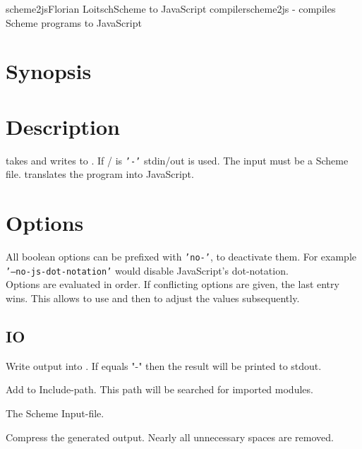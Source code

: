 
\begin{Name}{1}{scheme2js}{Florian Loitsch}{Scheme to JavaScript compiler}{scheme2js}
 - compiles Scheme programs to JavaScript
\end{Name}

\section{Synopsis}
                                      
\section{Description}
 takes  and writes to . If
/ is \texttt{'-'} stdin/out is used. The input must be a
Scheme file.  translates the program into JavaScript.
\section{Options}
All boolean options can be prefixed with \texttt{'no-'}, to deactivate them. For
     example \texttt{'--no-js-dot-notation'} would disable JavaScript's dot-notation.\\
Options are evaluated in order. If conflicting options are given, the last
entry wins. This allows to use   and then to adjust the values subsequently.
\subsection{IO}

\begin{Description}
\item[\OptArg{-o}{ outfile}] Write output into . If  equals "-"
		  then the result will be printed to stdout.
\item[\OptArg{-I}{ dir}] Add  to Include-path. This path will be searched for
		imported modules.
\item[\Arg{infile}] The Scheme Input-file.
\item[\Opt{--compress}] Compress the generated output. Nearly all unnecessary
spaces are removed.
\end{Description}
